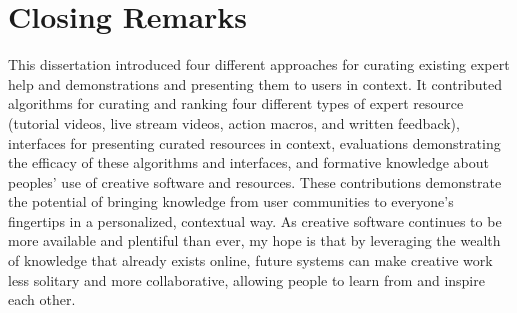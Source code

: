 

\section{Closing Remarks}
This dissertation introduced four different approaches for curating existing expert help and demonstrations and presenting them to users in context. It contributed algorithms for curating and ranking four different types of expert resource (tutorial videos, live stream videos, action macros, and written feedback), interfaces for presenting curated resources in context, evaluations demonstrating the efficacy of these algorithms and interfaces, and formative knowledge about peoples' use of creative software and resources. These contributions demonstrate the potential of bringing knowledge from user communities to everyone's fingertips in a personalized, contextual way. As creative software continues to be more available and plentiful than ever, my hope is that by leveraging the wealth of knowledge that already exists online, future systems can make creative work less solitary and more collaborative, allowing people to learn from and inspire each other.
